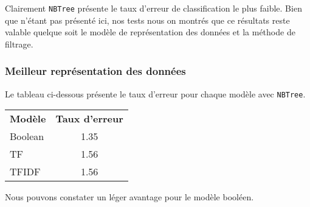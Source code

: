 Clairement \texttt{NBTree} présente le taux d'erreur de classification le plus faible. Bien que n'étant pas présenté ici, nos tests nous on montrés que ce résultats reste valable quelque soit le modèle de représentation des données  et la méthode de filtrage.

\subsubsection{Meilleur représentation des données}

Le tableau ci-dessous présente le taux d'erreur pour chaque modèle avec \texttt{NBTree}.

\begin{tabular}{l c} 
\textbf{Modèle} & \textbf{Taux d'erreur}\\
Boolean & 1.35\\
TF & 1.56\\
TFIDF & 1.56\\
\end{tabular}

Nous pouvons constater un léger avantage pour le modèle booléen. 




